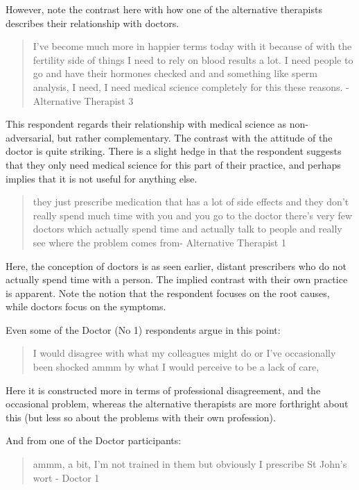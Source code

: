 However, note the contrast here with how one of the alternative therapists describes their relationship with doctors. 

\begin{quotation}
  I've become much more in happier terms today with it because of with the fertility side of things I need to rely on blood results a lot. I need people to go and have their hormones checked and and something like sperm analysis, I need, I need medical science completely for this these reasons.
- Alternative Therapist 3
\end{quotation}

This respondent regards their relationship with medical science as non-adversarial, but rather complementary. The contrast with the attitude of the doctor is quite striking. There is a slight hedge in that the respondent suggests that they only need medical science for this part of their practice, and perhaps implies that it is not useful for anything else. 


\begin{quotation}
  they just prescribe medication that has a lot of side effects and they don't really spend much time with you and you go to the doctor there's very few doctors which actually spend time and actually talk to people and really see where the problem comes from-
Alternative Therapist 1
\end{quotation}

Here, the conception of doctors is as seen earlier, distant prescribers who do not actually spend time with a person. The implied contrast with their own practice is apparent. Note the notion that the respondent focuses on the root causes, while doctors focus on the symptoms. 

Even some of the Doctor (No 1) respondents argue in this point:

\begin{quotation}
  I would disagree with what my colleagues might do or I've occasionally been shocked ammm by what I would perceive to be a lack of care,

\end{quotation}

Here it is constructed more in terms of professional disagreement, and the occasional problem, whereas the alternative therapists are more forthright about this (but less so about the problems with their own profession). 

And from one of the Doctor participants: 

\begin{quotation}
  ammm, a bit, I'm not trained in them but obviously I prescribe St John's wort
  - Doctor 1
\end{quotation}

